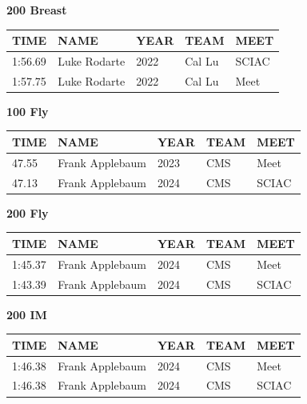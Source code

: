 \begin{table}[H]
\centering
\begin{minipage}[t]{0.48\textwidth}
\centering
\textbf{200 Breast}\\[0.1cm]
\begin{tabular}{@{}p{1.8cm}p{2.8cm}p{1.2cm}p{1.4cm}p{1.4cm}@{}}
\hline
    \textbf{TIME} & \textbf{NAME} & \textbf{YEAR} & \textbf{TEAM} & \textbf{MEET} \\
\hline
    1:56.69 & Luke Rodarte & 2022 & Cal Lu & SCIAC \\
    1:57.75 & Luke Rodarte & 2022 & Cal Lu & Meet \\
\hline
\end{tabular}
\end{minipage}\hfill
\begin{minipage}[t]{0.48\textwidth}
\centering
\textbf{100 Fly}\\[0.1cm]
\begin{tabular}{@{}p{1.8cm}p{2.8cm}p{1.2cm}p{1.4cm}p{1.4cm}@{}}
\hline
    \textbf{TIME} & \textbf{NAME} & \textbf{YEAR} & \textbf{TEAM} & \textbf{MEET} \\
\hline
    47.55 & Frank Applebaum & 2023 & CMS & Meet \\
    47.13 & Frank Applebaum & 2024 & CMS & SCIAC \\
\hline
\end{tabular}
\end{minipage}
\end{table}

\begin{table}[H]
\centering
\begin{minipage}[t]{0.48\textwidth}
\centering
\textbf{200 Fly}\\[0.1cm]
\begin{tabular}{@{}p{1.8cm}p{2.8cm}p{1.2cm}p{1.4cm}p{1.4cm}@{}}
\hline
    \textbf{TIME} & \textbf{NAME} & \textbf{YEAR} & \textbf{TEAM} & \textbf{MEET} \\
\hline
    1:45.37 & Frank Applebaum & 2024 & CMS & Meet \\
    1:43.39 & Frank Applebaum & 2024 & CMS & SCIAC \\
\hline
\end{tabular}
\end{minipage}\hfill
\begin{minipage}[t]{0.48\textwidth}
\centering
\textbf{200 IM}\\[0.1cm]
\begin{tabular}{@{}p{1.8cm}p{2.8cm}p{1.2cm}p{1.4cm}p{1.4cm}@{}}
\hline
    \textbf{TIME} & \textbf{NAME} & \textbf{YEAR} & \textbf{TEAM} & \textbf{MEET} \\
\hline
    1:46.38 & Frank Applebaum & 2024 & CMS & Meet \\
    1:46.38 & Frank Applebaum & 2024 & CMS & SCIAC \\
\hline
\end{tabular}
\end{minipage}
\end{table}

